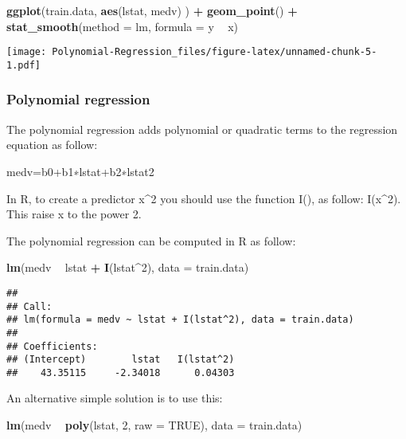 \documentclass[]{article}
\newenvironment{Shaded}{\begin{snugshade}}{\end{snugshade}}
\newcommand{\DataTypeTok}[1]{\textcolor[rgb]{0.13,0.29,0.53}{#1}}
\newcommand{\DecValTok}[1]{\textcolor[rgb]{0.00,0.00,0.81}{#1}}
\newcommand{\KeywordTok}[1]{\textcolor[rgb]{0.13,0.29,0.53}{\textbf{#1}}}
\newcommand{\NormalTok}[1]{#1}
\newcommand{\OperatorTok}[1]{\textcolor[rgb]{0.81,0.36,0.00}{\textbf{#1}}}
\newcommand{\OtherTok}[1]{\textcolor[rgb]{0.56,0.35,0.01}{#1}}
\newcommand{\StringTok}[1]{\textcolor[rgb]{0.31,0.60,0.02}{#1}}
\begin{document}
\begin{Shaded}
\begin{Highlighting}[]
\KeywordTok{ggplot}\NormalTok{(train.data, }\KeywordTok{aes}\NormalTok{(lstat, medv) ) }\OperatorTok{+}
\StringTok{  }\KeywordTok{geom_point}\NormalTok{() }\OperatorTok{+}
\StringTok{  }\KeywordTok{stat_smooth}\NormalTok{(}\DataTypeTok{method =}\NormalTok{ lm, }\DataTypeTok{formula =}\NormalTok{ y }\OperatorTok{~}\StringTok{ }\NormalTok{x)}
\end{Highlighting}
\end{Shaded}

\texttt{[image: Polynomial-Regression\_files/figure-latex/unnamed-chunk-5-1.pdf]}

\hypertarget{polynomial-regression}{%
\subsubsection{Polynomial regression}\label{polynomial-regression}}

The polynomial regression adds polynomial or quadratic terms to the
regression equation as follow:

medv=b0+b1∗lstat+b2∗lstat2

In R, to create a predictor x\^{}2 you should use the function I(), as
follow: I(x\^{}2). This raise x to the power 2.

The polynomial regression can be computed in R as follow:

\begin{Shaded}
\begin{Highlighting}[]
\KeywordTok{lm}\NormalTok{(medv }\OperatorTok{~}\StringTok{ }\NormalTok{lstat }\OperatorTok{+}\StringTok{ }\KeywordTok{I}\NormalTok{(lstat}\OperatorTok{^}\DecValTok{2}\NormalTok{), }\DataTypeTok{data =}\NormalTok{ train.data)}
\end{Highlighting}
\end{Shaded}

\begin{verbatim}
## 
## Call:
## lm(formula = medv ~ lstat + I(lstat^2), data = train.data)
## 
## Coefficients:
## (Intercept)        lstat   I(lstat^2)  
##    43.35115     -2.34018      0.04303
\end{verbatim}

An alternative simple solution is to use this:

\begin{Shaded}
\begin{Highlighting}[]
\KeywordTok{lm}\NormalTok{(medv }\OperatorTok{~}\StringTok{ }\KeywordTok{poly}\NormalTok{(lstat, }\DecValTok{2}\NormalTok{, }\DataTypeTok{raw =} \OtherTok{TRUE}\NormalTok{), }\DataTypeTok{data =}\NormalTok{ train.data)}
\end{Highlighting}
\end{Shaded}
\end{document}
